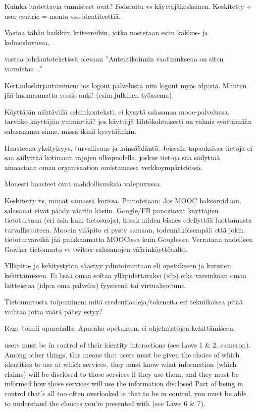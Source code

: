 \documentclass[finnish,gradu]{tktltiki}
\begin{document}


  Kuinka luotettavia tunnisteet ovat? Federoitu vs käyttäjäkeskeinen. Keskitetty + user centric = monta sso-identiteettiä.

  Vastaa tähän kaikkiin kriteereihin, jotka nostetaan esiin kakkos- ja kolmosluvussa.


  vastaa johdantotekstissä olevaan ''Autentikoinnin vaatimuksena on siten varmistaa ..''

  Kertauloskirjautuminen: jos logout palvelusta niin logout myös idp:stä. Muuten jää huomaamatta sessio auki! (esim julkinen työasema)

  Käyttäjän nähtävillä selainkonteksti, ei kysytä salasanaa mooc-palvelussa. tarviiko käyttäjän ymmärtää? jos käyttäjä lähtökohtaisesti on valmis syöttämään salasanansa sinne, missä ikinä kysytäänkin.

  Haasteena yksityisyys, turvallisuus ja lainsäädäntö. Joissain tapauksissa tietoja ei saa säilyttää kotimaan rajojen ulkopuolella, joskus tietoja saa säilyttää ainoastaan oman organisaation omistamassa verkkoympäristössä.

  Monesti haasteet ovat mahdollisuuksia valepuvussa.

  Keskitetty vs. munat samassa korissa. Painotetaan: Jos MOOC haksoroidaan, salasanat eivät päädy vääriin käsiin. Google/FB panostavat käyttäjien tietoturvaan (eri asia kuin tietosuoja), kosak niiden bisnes edellyttää luottamusta turvallisuuteen. Moocin ylläpito ei pysty samaan, todennäköisempää että jokin tietoturvareikä jää paikkaamatta MOOCissa kuin Googlessa. Verrataan uudelleen Gawker-tietomurto vs twitter-salasanojen väärinkäyttöaalto.

  Ylläpito- ja kehitystyötä säästyy ydintoimintaan eli opetukseen ja kurssien kehittämiseen. Ei lisää omaa softaa ylläpidettäväksi (idp) eikä varsinkaan omaa laitteistoa (idp:n oma palvelin) fyysisenä tai virtualisoituna.

  Tietomurrosta toipuminen: mitä credentiaaleja/tokeneita eri tekniikoissa pitää vaihtaa jotta väärä pääsy estyy?

  Rage toimii apurahalla. Apuraha opetuksen, ei ohjelmistojen kehittämiseen.

  users must be in control of their identity interactions (see Laws 1 \& 2, cameron). Among other things, this means that users must be given the choice of which identities to use at which services, they must know what information (which claims) will be disclosed to those services if they use them, and they must be informed how those services will use the information disclosed
  Part of being in control that’s all too often overlooked is that to be in control, you must be able to understand the choices you’re presented with (see Laws 6 \& 7).
\end{document}
